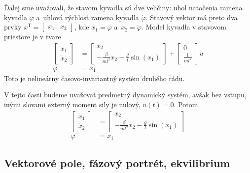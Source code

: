 \documentclass[a4paper, 10pt, ]{article}
\begin{document}
Ďalej sme uvažovali, že stavom kyvadla sú dve veličiny: uhol natočenia ramena kyvadla $\varphi$ a~uhlová rýchlosť ramena kyvadla $\dot\varphi$. Stavový vektor má preto dva prvky $x^{\mathsf{T}} = \begin{bmatrix} x_1 & x_2	\end{bmatrix}$, kde $x_1 = \varphi$ a~$x_2 = \dot\varphi$. Model kyvadla v stavovom priestore je v tvare
\begin{subequations}
	\begin{align}
		\begin{bmatrix}
			\dot{x}_1 \\ \dot{x}_2
		\end{bmatrix}
		&=
		\begin{bmatrix}
			x_2 \\ - \frac{\beta}{ml^2} x_2 - \frac{g}{l} \sin(x_1)
		\end{bmatrix}
		+
		\begin{bmatrix}
			0 \\ \frac{1}{ml^2}
		\end{bmatrix}
		u \\
		\varphi &= x_1
	\end{align}
\end{subequations}
Toto je nelineárny časovo-invariantný systém druhého rádu.

V tejto časti budeme uvažovať predmetný dynamický systém, avšak bez vstupu, inými slovami externý moment sily je nulový, $u(t) = 0$. Potom
\begin{subequations}
	\begin{align} \label{fajnVektRov}
		\begin{bmatrix}
			\dot{x}_1 \\ \dot{x}_2
		\end{bmatrix}
		&=
		\begin{bmatrix}
			x_2 \\ - \frac{\beta}{ml^2} x_2 - \frac{g}{l} \sin(x_1)
		\end{bmatrix}
 \\
		\varphi &= x_1
	\end{align}
\end{subequations}





\subsection{Vektorové pole, fázový portrét, ekvilibrium}
\end{document}
